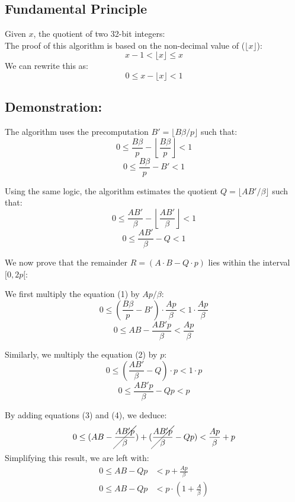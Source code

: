 \documentclass{article}
\begin{document}
\subsection{Fundamental Principle}
Given $x$, the quotient of two 32-bit integers: \\
The proof of this algorithm is based on the non-decimal value of ($\lfloor x \rfloor$):
$$x - 1 < \lfloor x \rfloor \le x$$
We can rewrite this as:
$$0 \le x - \lfloor x \rfloor < 1$$


\subsection{Demonstration:}
The algorithm uses the precomputation $B' = \lfloor B\beta/p \rfloor$ such that:
\[0 \le \frac{B\beta}{p} - \left\lfloor \frac{B\beta}{p} \right\rfloor < 1 \]
\begin{equation}
    0 \le \frac{B\beta}{p} - B' < 1
\end{equation}

Using the same logic, the algorithm estimates the quotient $Q = \lfloor AB'/\beta \rfloor$  such that:
\[0 \le \frac{AB'}{\beta} - \left\lfloor\frac{AB'}{\beta}\right\rfloor < 1\]
\begin{equation}
    0 \le \frac{AB'}{\beta} - Q < 1
\end{equation}

We now prove that the remainder $R = (A \cdot B -Q \cdot p)$ lies within the interval $[0, 2p[$:

We first multiply the equation (1) by $Ap/\beta$:
\[0 \le \left( \frac{B\beta}{p} - B' \right) \cdot \frac{Ap}{\beta} < 1 \cdot \frac{Ap}{\beta}\]
\begin{equation}
    0 \le AB - \frac{AB'p}{\beta} < \frac{Ap}{\beta}
\end{equation}

Similarly, we multiply the equation (2) by $p$:
\[0 \le \left( \frac{AB'}{\beta} - Q \right) \cdot p < 1 \cdot p\]
\begin{equation}
    0 \le \frac{AB'p}{\beta} - Qp < p
\end{equation}

By adding equations (3) and (4), we deduce:
\[0 \le (AB - \cancel{\frac{AB'p}{\beta}}) + (\cancel{\frac{AB'p}{\beta}} - Qp) < \frac{Ap}{\beta} + p\]
Simplifying this result, we are left with:
\begin{align*}
    0 \le AB - Qp & < p + \frac{Ap}{\beta}          \\
    0 \le AB - Qp & < p \cdot (1 + \frac{A}{\beta})
\end{align*}
\end{document}
